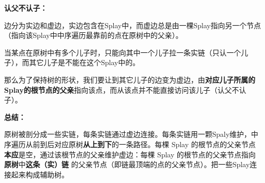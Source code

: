\par \noindent \textbf{认父不认子：}
~\\
\par \noindent 边分为实边和虚边，实边包含在Splay中，而虚边总是由一棵Splay指向另一个节点（指向该Splay中中序遍历最靠前的点在原树中的父亲）。
~\\
\par \noindent 当某点在原树中有多个儿子时，只能向其中一个儿子拉一条实链（只认一个儿子），而其它儿子是不能在这个Splay中的。
~\\
\par \noindent 那么为了保持树的形状，我们要让到其它儿子的边变为虚边，由\textbf{对应儿子所属的Splay的根节点的父亲}指向该点，而从该点并不能直接访问该儿子（认父不认子）。
~\\
\par \noindent \textbf{总结：}
~\\
\par \noindent 原树被剖分成一些实链，每条实链通过虚边连接。每条实链用一颗Spaly维护，中序遍历从前到后对应原树\textbf{从上到下}的一条路径。每棵 Splay 的根节点的父亲节点\textbf{本应}是空，通过该根节点的父亲维护虚边：每棵 Splay 的根节点的父亲节点指向\textbf{原树}中\textbf{这条（实）链} 的父亲节点（即链最顶端的点的父亲节点）。把一些Splay连接起来构成辅助树。

